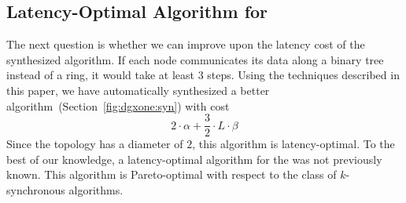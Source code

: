 \subsection{Latency-Optimal Algorithm for \dgxone}
The next question is whether we can improve upon the latency cost of the synthesized algorithm. If each node communicates its data along a binary tree instead of a ring, it would take at least $3$ steps. Using the techniques described in this paper, we have automatically synthesized a better algorithm~(Section~\ref{fig:dgxone:syn}) with cost $$2\cdot \alpha + \frac{3}{2}\cdot L \cdot \beta$$
Since the \dgxone topology has a diameter of $2$, this algorithm is latency-optimal. To the best of our knowledge, a latency-optimal algorithm for the \dgxone was not previously known. This algorithm is Pareto-optimal with respect to the class of $k$-synchronous algorithms.


